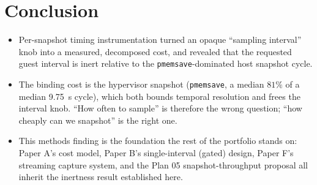 \documentclass[conference]{IEEEtran}
\begin{document}
\section{Conclusion}
\begin{itemize}
  \item Per-snapshot timing instrumentation turned an opaque ``sampling
        interval'' knob into a measured, decomposed cost, and revealed that
        the requested guest interval is inert relative to the
        \texttt{pmemsave}-dominated host snapshot cycle.
  \item The binding cost is the hypervisor snapshot (\texttt{pmemsave}, a
        median $81\%$ of a median \SI{9.75}{\second} cycle), which both bounds
        temporal resolution and frees the interval knob. ``How often to
        sample'' is therefore the wrong question; ``how cheaply can we
        snapshot'' is the right one.
  \item This methods finding is the foundation the rest of the portfolio
        stands on: Paper A's cost model, Paper B's single-interval (gated)
        design, Paper F's streaming capture system, and the Plan 05
        snapshot-throughput proposal all inherit the inertness result
        established here.
\end{itemize}



\end{document}
